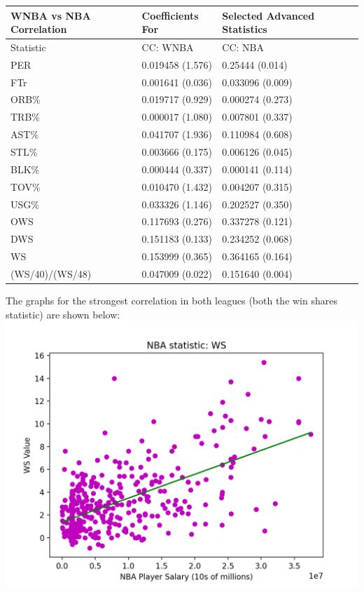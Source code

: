 \documentclass[12pt]{article}
\begin{document}
\begin{tabular}{*5l}    \toprule
WNBA vs NBA Correlation & Coefficients For & Selected Advanced Statistics \\\midrule

Statistic 
&  CC: WNBA   & CC: NBA \\ 

 PER  &  0.019458 (1.576)  & 0.25444 (0.014) \\
 FTr   &  0.001641 (0.036)  & 0.033096 (0.009)       \\ 
 ORB\%   &  0.019717 (0.929)  & 0.000274 (0.273)       \\   
 TRB\%   &  0.000017 (1.080)   & 0.007801 (0.337)       \\
 AST\%   &  0.041707 (1.936)  & 0.110984 (0.608)    \\
 STL\%  &  0.003666 (0.175)  & 0.006126 (0.045)       \\    
 BLK\%  & 0.000444 (0.337)   & 0.000141 (0.114)     \\
 TOV\%  & 0.010470 (1.432)  & 0.004207 (0.315)    \\
 USG\%   & 0.033326 (1.146)   & 0.202527 (0.350)       \\
 OWS   & 0.117693 (0.276)   & 0.337278 (0.121)        \\
 DWS  & 0.151183 (0.133)   & 0.234252 (0.068)         \\
 WS   &  0.153999 (0.365)  & 0.364165 (0.164)                 \\
 (WS/40)/(WS/48)   &  0.047009 (0.022)  & 0.151640 (0.004) \\
 \hline
\end{tabular}
\newline
\par
The graphs for the strongest correlation in both leagues (both the win shares statistic) are shown below:
\newline
\includegraphics[width=.85\textwidth]{NBA_WS_Graph.png}
\end{document}
